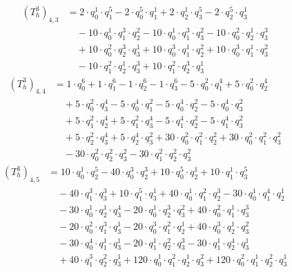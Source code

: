 \begin{align*}(T_{h}^3)_{4,3}&=2\cdot q_0^{1}\cdot q_1^{5}-2\cdot q_0^{5}\cdot q_1^{1}+2\cdot q_2^{1}\cdot q_3^{5}-2\cdot q_2^{5}\cdot q_3^{1}\\
&\quad -10\cdot q_0^{1}\cdot q_1^{3}\cdot q_2^{2}-10\cdot q_0^{1}\cdot q_1^{3}\cdot q_3^{2}-10\cdot q_0^{2}\cdot q_2^{1}\cdot q_3^{3}\\
&\quad +10\cdot q_0^{2}\cdot q_2^{3}\cdot q_3^{1}+10\cdot q_0^{3}\cdot q_1^{1}\cdot q_2^{2}+10\cdot q_0^{3}\cdot q_1^{1}\cdot q_3^{2}\\
&\quad -10\cdot q_1^{2}\cdot q_2^{1}\cdot q_3^{3}+10\cdot q_1^{2}\cdot q_2^{3}\cdot q_3^{1}\end{align*}
\begin{align*}(T_{h}^3)_{4,4}&=1\cdot q_0^{6}+1\cdot q_1^{6}-1\cdot q_2^{6}-1\cdot q_3^{6}-5\cdot q_0^{2}\cdot q_1^{4}+5\cdot q_0^{2}\cdot q_2^{4}\\
&\quad +5\cdot q_0^{2}\cdot q_3^{4}-5\cdot q_0^{4}\cdot q_1^{2}-5\cdot q_0^{4}\cdot q_2^{2}-5\cdot q_0^{4}\cdot q_3^{2}\\
&\quad +5\cdot q_1^{2}\cdot q_2^{4}+5\cdot q_1^{2}\cdot q_3^{4}-5\cdot q_1^{4}\cdot q_2^{2}-5\cdot q_1^{4}\cdot q_3^{2}\\
&\quad +5\cdot q_2^{2}\cdot q_3^{4}+5\cdot q_2^{4}\cdot q_3^{2}+30\cdot q_0^{2}\cdot q_1^{2}\cdot q_2^{2}+30\cdot q_0^{2}\cdot q_1^{2}\cdot q_3^{2}\\
&\quad -30\cdot q_0^{2}\cdot q_2^{2}\cdot q_3^{2}-30\cdot q_1^{2}\cdot q_2^{2}\cdot q_3^{2}\end{align*}
\begin{align*}(T_{h}^3)_{4,5}&=10\cdot q_0^{1}\cdot q_2^{5}-40\cdot q_0^{3}\cdot q_2^{3}+10\cdot q_0^{5}\cdot q_2^{1}+10\cdot q_1^{1}\cdot q_3^{5}\\
&\quad -40\cdot q_1^{3}\cdot q_3^{3}+10\cdot q_1^{5}\cdot q_3^{1}+40\cdot q_0^{1}\cdot q_1^{2}\cdot q_2^{3}-30\cdot q_0^{1}\cdot q_1^{4}\cdot q_2^{1}\\
&\quad -30\cdot q_0^{1}\cdot q_2^{1}\cdot q_3^{4}-20\cdot q_0^{1}\cdot q_2^{3}\cdot q_3^{2}+40\cdot q_0^{2}\cdot q_1^{1}\cdot q_3^{3}\\
&\quad -20\cdot q_0^{2}\cdot q_1^{3}\cdot q_3^{1}-20\cdot q_0^{3}\cdot q_1^{2}\cdot q_2^{1}+40\cdot q_0^{3}\cdot q_2^{1}\cdot q_3^{2}\\
&\quad -30\cdot q_0^{4}\cdot q_1^{1}\cdot q_3^{1}-20\cdot q_1^{1}\cdot q_2^{2}\cdot q_3^{3}-30\cdot q_1^{1}\cdot q_2^{4}\cdot q_3^{1}\\
&\quad +40\cdot q_1^{3}\cdot q_2^{2}\cdot q_3^{1}+120\cdot q_0^{1}\cdot q_1^{2}\cdot q_2^{1}\cdot q_3^{2}+120\cdot q_0^{2}\cdot q_1^{1}\cdot q_2^{2}\cdot q_3^{1}\end{align*}
